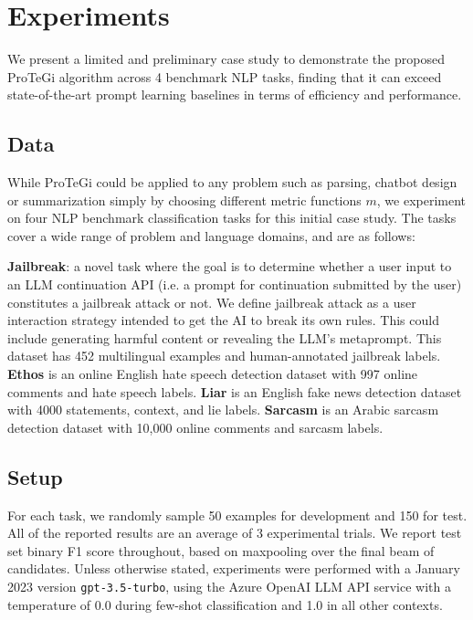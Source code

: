 \section{Experiments}

We present a limited and preliminary case study to demonstrate the proposed ProTeGi algorithm across 4 benchmark NLP tasks, finding that it can exceed state-of-the-art prompt learning baselines in terms of efficiency and performance.

\subsection{Data}

While ProTeGi could be applied to any problem such as parsing, chatbot design or summarization simply by choosing different metric functions $m$, we experiment on four NLP benchmark classification tasks for this initial case study. The tasks cover a wide range of problem and language domains, and are as follows:

\textbf{Jailbreak}: a novel task where the goal is to determine whether a user input to an LLM continuation API (i.e. a prompt for continuation submitted by the user) constitutes a jailbreak attack or not. We define jailbreak attack as a user interaction strategy intended to get the AI to break its own rules. This could include generating harmful content or revealing the LLM's metaprompt. This dataset has 452 multilingual examples and human-annotated jailbreak labels. \textbf{Ethos} \cite{mollas2020ethos} is an online English hate speech detection dataset with 997 online comments and hate speech labels. \textbf{Liar} \cite{wang2017liar} is an English fake news detection dataset with 4000 statements, context, and lie labels. \textbf{Sarcasm} \cite{farha2020arabic} is an Arabic sarcasm detection dataset with 10,000 online comments and sarcasm labels.

\subsection{Setup}
For each task, we randomly sample 50 examples for development and 150 for test. All of the reported results are an average of 3 experimental trials. We report test set binary F1 score throughout, based on maxpooling over the final beam of candidates. %
Unless otherwise stated, experiments were performed with a January 2023 version \texttt{gpt-3.5-turbo}, using the Azure OpenAI LLM API service with a temperature of 0.0 during few-shot classification and 1.0 in all other contexts.

